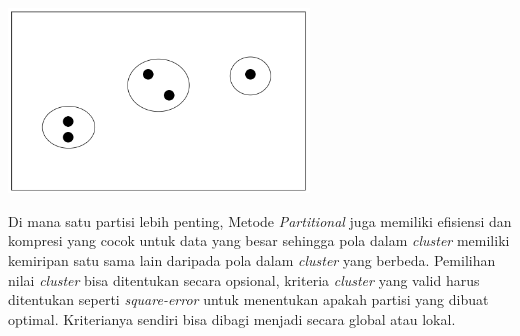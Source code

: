 \begin{enumerate}[leftmargin=1.3cm]
	\begin{center}
		\includegraphics[width=8cm]{img/bab_2/partional.png}
		\label{fig:asd}
	\end{center}

	Di mana satu partisi lebih penting, Metode \textit{Partitional} juga memiliki efisiensi dan kompresi yang cocok untuk data yang besar sehingga pola dalam \textit{cluster} memiliki kemiripan satu sama lain daripada pola dalam \textit{cluster} yang berbeda. Pemilihan nilai \textit{cluster} bisa ditentukan secara opsional, kriteria \textit{cluster} yang valid harus ditentukan seperti \textit{square-error} untuk menentukan apakah partisi yang dibuat optimal. Kriterianya sendiri bisa dibagi menjadi secara global atau lokal.  

\end{enumerate}	

